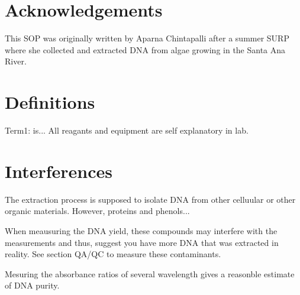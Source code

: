 \documentclass[12pt]{../SOP3_alpha}\usepackage[]{graphicx}\usepackage[]{color}
\begin{document}
\tableofcontents

\newpage

\section{Acknowledgements}

This SOP was originally written by Aparna Chintapalli after a summer SURP where she collected and extracted DNA from algae growing in the Santa Ana River.

\section{Definitions}

\NP Term1: is... All reagants and equipment are self explanatory in lab. 

\section{Interferences}

\NP The extraction process is supposed to isolate DNA from other celluular or other organic materials. However, proteins and phenols...  

\NP When meausuring the DNA yield, these compounds may interfere with the measurements and thus, suggest you have more DNA that was extracted in reality. See section QA/QC to measure these contaminants.

\NP Mesuring the absorbance ratios of several wavelength gives a reasonble estimate of DNA purity. 
\end{document}
